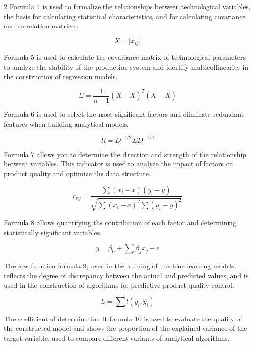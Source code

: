 \begin{multicols}{2}
Formula 4 is used to formalize the relationships between technological
variables, the basis for calculating statistical characteristics, and
for calculating covariance and correlation matrices.

\begin{equation}
X = \lbrack x_{ij}\rbrack
\end{equation}

Formula 5 is used to calculate the covariance matrix of technological
parameters to analyze the stability of the production system and
identify multicollinearity in the construction of regression models.

\begin{equation}
\Sigma = \frac{1}{n-1} (X - \bar{X})^T (X - \bar{X})
\end{equation}

Formula 6 is used to select the most significant factors and eliminate
redundant features when building analytical models.

\begin{equation}
R = D^{-1/2} \Sigma D^{-1/2}
\end{equation}

Formula 7 allows you to determine the direction and strength of the
relationship between variables. This indicator is used to analyze the
impact of factors on product quality and optimize the data structure.

\begin{equation}
r_{xy} = \frac{\sum (x_{i} - \bar{x})(y_{i} - \bar{y})}{\sqrt{\sum (x_{i} - \bar{x})^{2} \sum (y_{i} - \bar{y})^{2}}}
\end{equation}

Formula 8 allows quantifying the contribution of each factor and
determining statistically significant variables.

\begin{equation}
y = \beta_{0} + \sum \beta_{j} x_{j} + \epsilon
\end{equation}

The loss function formula 9, used in the training of machine learning
models, reflects the degree of discrepancy between the actual and
predicted values, and is used in the construction of algorithms for
predictive product quality control.

\begin{equation}
L = \sum l(y_{i}, \hat{y}_{i})
\end{equation}

The coefficient of determination R formula 10 is used
to evaluate the quality of the constructed model and shows the
proportion of the explained variance of the target variable, used to
compare different variants of analytical algorithms.


\end{multicols}
